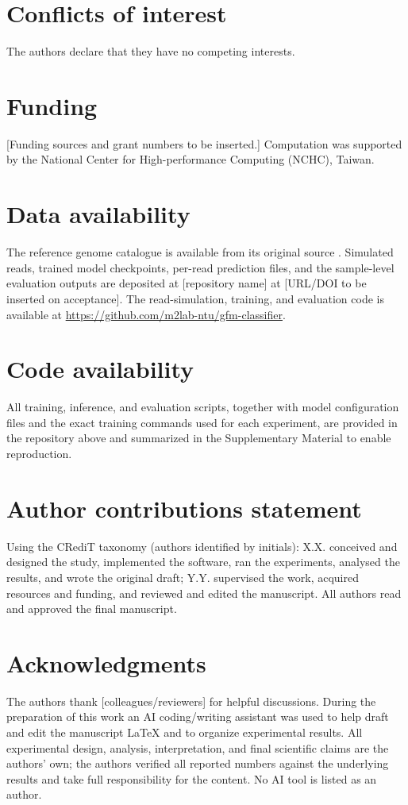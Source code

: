 \section{Conflicts of interest}
The authors declare that they have no competing interests.

\section{Funding}
[Funding sources and grant numbers to be inserted.] Computation was supported by
the National Center for High-performance Computing (NCHC), Taiwan.

\section{Data availability}
The reference genome catalogue is available from its original source
\citep{Almeida2019}. Simulated reads, trained model checkpoints, per-read
prediction files, and the sample-level evaluation outputs are deposited at
[repository name] at [URL/DOI to be inserted on acceptance]. The read-simulation,
training, and evaluation code is available at
\url{https://github.com/m2lab-ntu/gfm-classifier}.

\section{Code availability}
All training, inference, and evaluation scripts, together with model
configuration files and the exact training commands used for each experiment,
are provided in the repository above and summarized in the Supplementary
Material to enable reproduction.

\section{Author contributions statement}
Using the CRediT taxonomy (authors identified by initials):
X.X. conceived and designed the study, implemented the software, ran the
experiments, analysed the results, and wrote the original draft;
Y.Y. supervised the work, acquired resources and funding, and reviewed and
edited the manuscript. All authors read and approved the final manuscript.

\section{Acknowledgments}
The authors thank [colleagues/reviewers] for helpful discussions. During the
preparation of this work an AI coding/writing assistant was used to help draft
and edit the manuscript \LaTeX{} and to organize experimental results. All
experimental design, analysis, interpretation, and final scientific claims are
the authors' own; the authors verified all reported numbers against the
underlying results and take full responsibility for the content. No AI tool is
listed as an author.
